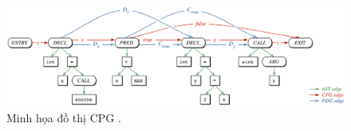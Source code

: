 
\begin{figure}[H]
  \includegraphics[width=1\columnwidth]{figures/c2/c2_cpg_yamaguchi.png}
  \centering
  \caption{Minh họa đồ thị CPG \cite{yamaguchi2014modeling}.}
  \label{img:c2_cpg_yamaguchi}
\end{figure}



